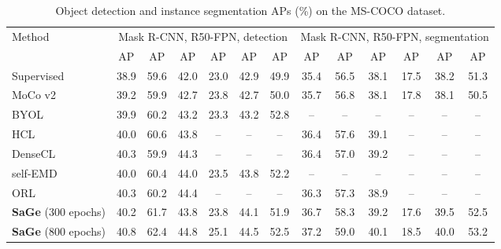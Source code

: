 \documentclass[10pt,twocolumn,letterpaper]{article}
\begin{document}
\begin{table*}[]
\renewcommand\arraystretch{1.0}
\setlength{\tabcolsep}{2.0mm}
\fontsize{9.0}{11}\selectfont
\centering
\begin{tabular}{l|cccccc|cccccc}
\toprule
\multirow{2}{*}{Method} & \multicolumn{6}{c|}{Mask R-CNN, R50-FPN, detection}  &\multicolumn{6}{c}{Mask R-CNN, R50-FPN, segmentation} \\
& AP  & AP & AP & AP  & AP &AP &AP  &AP  &AP  &AP  &AP &AP \\ \midrule

Supervised                  &38.9  &59.6  &42.0  &23.0  &42.9  &49.9    &35.4  &56.5  &38.1  &17.5  &38.2 &51.3     \\ \midrule
MoCo v2 ~\cite{chen2020improved} &39.2  &59.9 &42.7 &23.8 &42.7 &50.0    &35.7  &56.8  &38.1  &17.8  &38.1  &50.5   \\
BYOL ~\cite{grill2020bootstrap} &39.9 &60.2 &43.2 &23.3 &43.2 &52.8   &-- &--	&-- &-- &-- &--\\
HCL~\cite{HCL}  &40.0  & 60.6  &43.8  & --  & -- & -- &36.4  &57.6  & 39.1 &--  &--  &--\\
DenseCL~\cite{wang2021dense}  &40.3 &59.9 &44.3 &-- &-- &--    &36.4 &57.0 &39.2 &-- &-- &-- \\ 
self-EMD~\cite{liu2020self}  &40.0   &60.4  &44.0  &23.5  &43.8  &52.2   &-- &--	&-- &-- &-- &--\\
ORL~\cite{ORL} &40.3  &60.2  &44.4  &-- &-- &--  &36.3  &57.3  & 38.9  &-- &-- &-- \\ \midrule

\textbf{SaGe} (300 epochs) &40.2  &61.7  &43.8  &23.8  &44.1   &51.9  &36.7  &58.3  &39.2  &17.6  &39.5  &52.5 \\
\textbf{SaGe} (800 epochs) &40.8  &62.4  &44.8   &25.1  &44.5  &52.5   &37.2  &59.0  &40.1  &18.5  &40.0  &53.2  \\ 
\bottomrule
\end{tabular}
\caption{Object detection and instance segmentation APs (\%) on the MS-COCO dataset.}
\label{tab:coco}
\end{table*}
\end{document}
